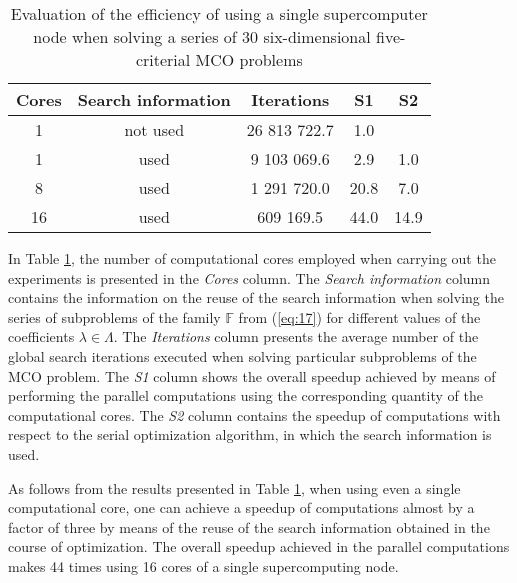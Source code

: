 \documentclass{svproc}
\begin{document}
\begin{table}[htbp]
\centering
\caption{Evaluation of the efficiency of using a single supercomputer node when solving a series of 30 six-dimensional five-criterial MCO problems}
\label{tab:02}
\begin{tabular}{ccccc}
\hline
Cores & Search information & Iterations   & S1   & S2   \\ \hline
1     & not used           & 26 813 722.7 & 1.0  &      \\
1     & used               & 9 103 069.6  & 2.9  & 1.0  \\
8     & used               & 1 291 720.0  & 20.8 & 7.0  \\
16    & used               & 609 169.5    & 44.0 & 14.9 \\ \hline
\end{tabular}
\end{table}

In Table \ref{tab:02}, the number of computational cores employed when carrying out the experiments is presented in the \textit{Cores} column. The \textit{Search information} column contains the information on the reuse of the search information when solving the series of subproblems of the family $\mathbb{F}$ from (\ref{eq:17}) for different values of the coefficients $\lambda \in \Lambda$. The \textit{Iterations} column presents the average number of the global search iterations executed when solving particular subproblems of the MCO problem. The \textit{S1} column shows the overall speedup achieved by means of performing the parallel computations using the corresponding quantity of the computational cores. The \textit{S2} column contains the speedup of computations with respect to the serial optimization algorithm, in which the search information is used. 

As follows from the results presented in Table \ref{tab:02}, when using even a single computational core, one can achieve a speedup of computations almost by a factor of three by means of the reuse of the search information obtained in the course of optimization. The overall speedup achieved in the parallel computations makes 44 times using 16 cores of a single supercomputing node.
\end{document}

